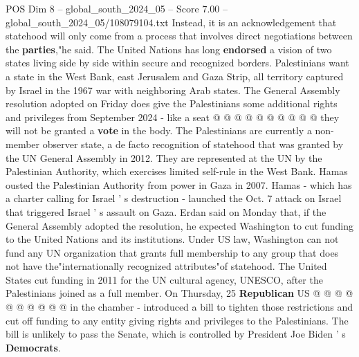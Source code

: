 \begin{textsample}{POS Dim 8 – global\_south\_2024\_05 – Score 7.00 – global\_south\_2024\_05/108079104.txt}
Instead, it is an acknowledgement that statehood will only come from a process that involves direct negotiations between the \textbf{parties},"he said.
The United Nations has long \textbf{endorsed} a vision of two states living side by side within secure and recognized borders.
Palestinians want a state in the West Bank, east Jerusalem and Gaza Strip, all territory captured by Israel in the 1967 war with neighboring Arab states.
The General Assembly resolution adopted on Friday does give the Palestinians some additional rights and privileges from September 2024 - like a seat @ @ @ @ @ @ @ @ @ @ they will not be granted a \textbf{vote} in the body.
The Palestinians are currently a non-member observer state, a de facto recognition of statehood that was granted by the UN General Assembly in 2012.
They are represented at the UN by the Palestinian Authority, which exercises limited self-rule in the West Bank.
Hamas ousted the Palestinian Authority from power in Gaza in 2007.
Hamas - which has a charter calling for Israel ' s destruction - launched the Oct. 7 attack on Israel that triggered Israel ' s assault on Gaza.
Erdan said on Monday that, if the General Assembly adopted the resolution, he expected Washington to cut funding to the United Nations and its institutions.
Under US law, Washington can not fund any UN organization that grants full membership to any group that does not have the"internationally recognized attributes"of statehood.
The United States cut funding in 2011 for the UN cultural agency, UNESCO, after the Palestinians joined as a full member.
On Thursday, 25 \textbf{Republican} US @ @ @ @ @ @ @ @ @ @ in the chamber - introduced a bill to tighten those restrictions and cut off funding to any entity giving rights and privileges to the Palestinians.
The bill is unlikely to pass the Senate, which is controlled by President Joe Biden ' s \textbf{Democrats}.

\end{textsample}
